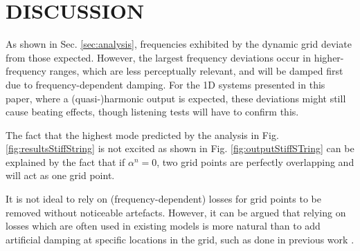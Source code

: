 \documentclass[fleqn]{jaes}
\def\SWcomment[#1]{\textcolor{blue}{#1}}
\begin{document}
 

\section{DISCUSSION}\label{sec:discussion}
As shown in Sec. \ref{sec:analysis}, frequencies exhibited by the dynamic grid deviate from those expected. However, the largest frequency deviations occur in higher-frequency ranges, which are less perceptually relevant, and will be damped first due to frequency-dependent damping. For the 1D systems presented in this paper, where a (quasi-)harmonic output is expected, these deviations might still cause beating effects, though listening tests will have to confirm this.

The fact that the highest mode predicted by the analysis in Fig. \ref{fig:resultsStiffString} is not excited as shown in Fig. \ref{fig:outputStiffSTring} can be explained by the fact that if $\alpha^n = 0$, two grid points are perfectly overlapping and will act as one grid point. 

It is not ideal to rely on (frequency-dependent) losses for grid points to be removed without noticeable artefacts. However, it can be argued that relying on losses which are often used in existing models is more natural than to add artificial damping at specific locations in the grid, such as done in previous work \cite{Willemsen2021a, Willemsen2021b}. %
\end{document}
